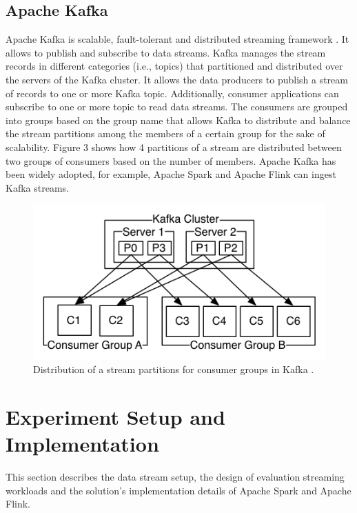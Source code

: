 \documentclass[]{article}
\begin{document}
\subsection{Apache Kafka}
\par Apache Kafka is scalable, fault-tolerant and distributed streaming framework \cite{kafka}. It allows to publish and subscribe to data streams.
Kafka manages the stream records in different categories (i.e., topics) that partitioned and distributed over the servers of the Kafka cluster. It allows the data producers to publish a stream of records to one or more  Kafka topic. Additionally, consumer applications can subscribe to one or more topic to read data streams. The consumers are grouped into groups based on the group name that allows Kafka to distribute and balance the stream partitions among the  members of a certain group for the sake of scalability. Figure 3 shows how 4 partitions of a stream are distributed between two groups of consumers based on the number of members. 
Apache Kafka has been widely  adopted, for example, 
Apache Spark and Apache Flink can ingest Kafka streams. 

\begin{figure}[h]
 
  \centering
    \includegraphics[width=\textwidth, height=.3\textheight]{kafka_groups.png}
     \caption{ Distribution of a stream partitions for consumer groups in Kafka \cite{kafka}.}
\end{figure} 

\section{Experiment Setup and Implementation}
This section describes the data stream setup, the design of evaluation streaming workloads and the solution's implementation details of  Apache Spark and Apache Flink.
\end{document}
